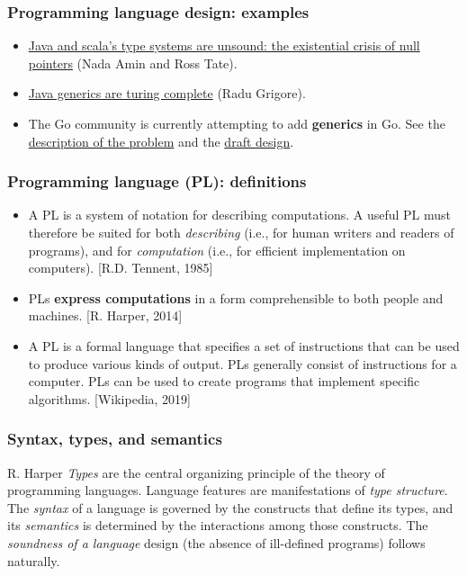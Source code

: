 \begin{frame}
  \frametitle{Programming language design: examples}

  \begin{itemize}
  \item \href{https://dl.acm.org/citation.cfm?id=2984004}{Java and
      scala's type systems are unsound: the existential crisis of null
      pointers} (Nada Amin and Ross Tate).
  \item \href{https://dl.acm.org/citation.cfm?id=3009871}{Java generics are turing complete} (Radu Grigore).
  \item The Go community is currently attempting to add
    \textbf{generics} in Go. See the
    \href{https://go.googlesource.com/proposal/+/master/design/go2draft-generics-overview.md}{description of the problem}
    and the
    \href{https://go.googlesource.com/proposal/+/master/design/go2draft-contracts.md}{draft
      design}.
  \end{itemize}
\end{frame}



\begin{frame}%
  \frametitle{Programming language (PL): definitions}
  
  \begin{itemize}
  \item A PL is a system of notation for describing computations. A
    useful PL must therefore be suited for both
    \emph{describing} (i.e., for human writers and readers of
    programs), and for \emph{computation} (i.e., for efficient
    implementation on computers). [R.D. Tennent, 1985]

  \item PLs \textbf{express computations} in a form comprehensible to both
    people and machines. [R. Harper, 2014]

  \item A PL is a formal language that specifies a set of instructions
    that can be used to produce various kinds of output. PLs generally
    consist of instructions for a computer. PLs can be used to create
    programs that implement specific algorithms. [Wikipedia, 2019]
  \end{itemize}  
\end{frame}


\begin{frame}
  \frametitle{Syntax, types, and semantics}
  \begin{aquote}{R. Harper}
    \emph{Types} are the central organizing principle of the theory of
    programming languages.
    Language features are manifestations of \emph{type structure}. The
    \emph{syntax} of a language is governed by the constructs that
    define its types, and its \emph{semantics} is determined by the
    interactions among those constructs. The \emph{soundness of a
      language} design (the absence of ill-defined programs) follows
    naturally.
  \end{aquote}
\end{frame}


